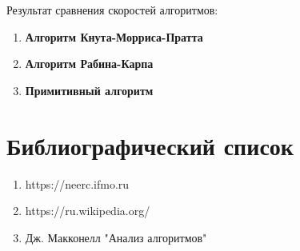 \documentclass[12pt]{article}
\begin{document}
Результат сравнения скоростей алгоритмов:
\begin{enumerate}
	\item \textbf{Алгоритм Кнута-Морриса-Пратта}
	\item \textbf{Алгоритм Рабина-Карпа}
	\item \textbf{Примитивный алгоритм}
\end{enumerate}
\section{Библиографический список}
\begin{enumerate}
	\item https://neerc.ifmo.ru
	\item https://ru.wikipedia.org/
	\item Дж. Макконелл "Анализ алгоритмов"
\end{enumerate}
\end{document}
